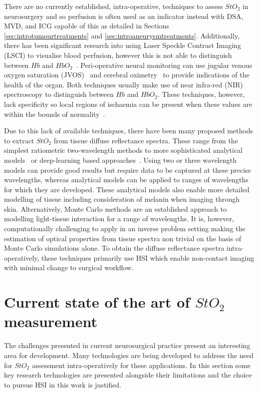 There are no currently established, intra-operative, techniques to assess $StO_2$ in neurosurgery and so perfusion is often used as an indicator instead with DSA, MVD, and ICG capable of this as detailed in Sections \ref{sec:introtumourtreatments} and \ref{sec:introaneurysmtreatments}. Additionally, there has been significant research into using Laser Speckle Contrast Imaging (LSCI) to visualise blood perfusion, however this is not able to distinguish between $Hb$ and $HbO_2$~\cite{Dunn2012, Zhong2021}. Peri-operative neural monitoring can use jugular venous oxygen saturation (JVOS)~\cite{Raith2020} and cerebral oximetry~\cite{Lian2020} to provide indications of the health of the organ. Both techniques usually make use of near infra-red (NIR) spectroscopy to distinguish between $Hb$ and $HbO_2$. These techniques, however, lack specificity so local regions of ischaemia can be present when these values are within the bounds of normality~\cite{Raith2020, Zhong2021}.

Due to this lack of available techniques, there have been many proposed methods to extract $StO_2$ from tissue diffuse reflectance spectra. These range from the simplest ratiometric two-wavelength methods to more sophisticated analytical models~\cite{MacKenzie2018} or deep-learning based approaches~\cite{Ayala2023}. Using two or three wavelength models can provide good results but require data to be captured at these precise wavelengths, whereas analytical models can be applied to ranges of wavelengths for which they are developed. These analytical models also enable more detailed modelling of tissue including consideration of melanin when imaging through skin. Alternatively, Monte Carlo methods are an established approach to modelling light-tissue interaction for a range of wavelengths. It is, however, computationally challenging to apply in an inverse problem setting making the estimation of optical properties from tissue spectra non trivial on the basis of Monte Carlo simulations alone. To obtain the diffuse reflectance spectra intra-operatively, these techniques primarily use HSI which enable non-contact imaging with minimal change to surgical workflow. 

\section{Current state of the art of $StO_2$ measurement}\label{sec:stateofart}
The challenges presented in current neurosurgical practice present an interesting area for development. Many technologies are being developed to address the need for $StO_2$ assessment intra-operatively for these applications. In this section some key research technologies are presented alongside their limitations and the choice to pursue HSI in this work is justified. 


